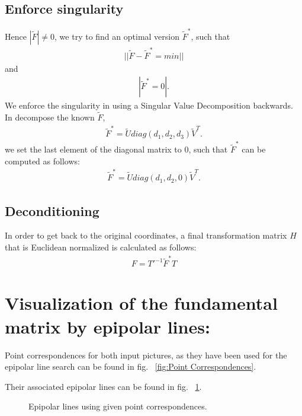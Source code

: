 \documentclass[a4paper,headings=small]{scrartcl}
\numberwithin{equation}{section} %
\numberwithin{figure}{section}   %
\newcommand{\generatedImgRootTarget}{../../../target}
\begin{document}
  \subsection{Enforce singularity}
Hence $|\tilde{F}|\neq 0$, we try  to find an optimal version $\tilde{F}^*$, such that
  \begin{align}
  ||\tilde{F}-\tilde{F}^*=min||
  \end{align}
and
  \begin{align}
  |\tilde{F}^*=0|.
  \end{align}
We enforce the singularity in using a Singular Value Decomposition backwards.
In decompose the known $\tilde{F}$,
  \begin{align}
  \tilde{F}^*=\tilde{U} diag(d_1,d_2,d_3)\tilde{V}^T.
  \end{align}  
we set the last element of the diagonal matrix to 0, such that $\tilde{F}^*$ can be computed
as follows:
  \begin{align}
  \tilde{F}^*=\tilde{U} diag(d_1,d_2,0)\tilde{V}^T.
  \end{align}
  \subsection{Deconditioning}
In order to get back to the original coordinates, a final transformation matrix $H$ 
that is Euclidean normalized is calculated as follows:
\begin{align}
F=T'^{-1}\tilde{F}^{*}T
\end{align}

\section{Visualization of the fundamental matrix by epipolar lines:}

Point correspondences for both input pictures, 
as they have been used for the epipolar line search 
can be found in fig. ~\ref{fig:Point Correspondences}.

Their associated epipolar lines can be found in fig. ~\ref{fig:Epipolar Lines}.
\begin{figure}
   \hfill
  \caption{Epipolar lines using given point correspondences.}
  \label{fig:Epipolar Lines}
\end{figure}
\end{document}
